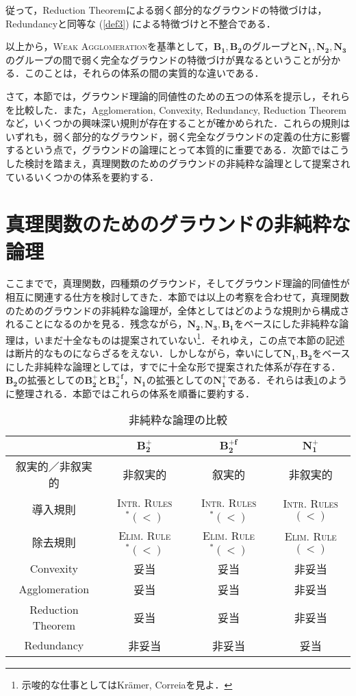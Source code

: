 \documentclass[twoside,14Q,dvipdfmx]{jsarticle}
\theoremstyle{definition}
\begin{document}
\noindent 従って，Reduction Theoremによる弱く部分的なグラウンドの特徴づけは，Redundancyと同等な (\ref{def3}) による特徴づけと不整合である．

以上から，\textsc{Weak Agglomeration}を基準として，$\mathbf{B_{1}}, \mathbf{B_{2}}$のグループと$\mathbf{N_{1}}, \mathbf{N_{2}}, \mathbf{N_{3}}$のグループの間で弱く完全なグラウンドの特徴づけが異なるということが分かる．このことは，それらの体系の間の実質的な違いである．

さて，本節では，グラウンド理論的同値性のための五つの体系を提示し，それらを比較した．また，Agglomeration, Convexity, Redundancy, Reduction Theoremなど，いくつかの興味深い規則が存在することが確かめられた．これらの規則はいずれも，弱く部分的なグラウンド，弱く完全なグラウンドの定義の仕方に影響するという点で，グラウンドの論理にとって本質的に重要である．次節ではこうした検討を踏まえ，真理関数のためのグラウンドの非純粋な論理として提案されているいくつかの体系を要約する．
%
%
%
\section{真理関数のためのグラウンドの非純粋な論理}\label{iplg}
ここまでで，真理関数，四種類のグラウンド，そしてグラウンド理論的同値性が相互に関連する仕方を検討してきた．本節では以上の考察を合わせて，真理関数のためのグラウンドの非純粋な論理が，全体としてはどのような規則から構成されることになるのかを見る．残念ながら，$\mathbf{N_{2}, N_{3}, B_{1}}$をベースにした非純粋な論理は，いまだ十全なものは提案されていない\footnote{示唆的な仕事としてはKr\"{a}mer\cite{Kramer2018,Kramer2021}, Correia\cite{Correia2016}を見よ．}．それゆえ，この点で本節の記述は断片的なものにならざるをえない．しかしながら，幸いにして$\mathbf{N_{1}, B_{2}}$をベースにした非純粋な論理としては，すでに十全な形で提案された体系が存在する．$\mathbf{B_{2}}$の拡張としての$\mathbf{B_{2}^{+}}$と$\mathbf{B_{2}^{+f}}$，$\mathbf{N_{1}}$の拡張としての$\mathbf{N_{1}^{+}}$である．それらは表\ref{ImpureLogics}のように整理される．本節ではこれらの体系を順番に要約する．

\begin{table}[h]
\caption{非純粋な論理の比較}
\label{ImpureLogics}
\centering
	\begin{tabular}{cccc}
	\hline
	 & $\mathbf{B_{2}^{+}}$ & $\mathbf{B_{2}^{+f}}$ & $\mathbf{N_{1}^{+}}$ \\
	\hline \hline
	叙実的／非叙実的 & 非叙実的 & 叙実的 & 非叙実的 \\
	導入規則 & \textsc{Intr. Rules$^{*}(<)$} & \textsc{Intr. Rules$^{*}(<)$} & \textsc{Intr. Rules$(<)$} \\
	除去規則 & \textsc{Elim. Rule$^{*}(<)$} & \textsc{Elim. Rule$^{*}(<)$} & \textsc{Elim. Rule$(<)$} \\
	Convexity & 妥当 & 妥当 & 非妥当 \\
	Agglomeration & 妥当 & 妥当 & 非妥当 \\
	Reduction Theorem & 妥当 & 妥当 & 非妥当 \\
	Redundancy & 非妥当 & 非妥当 & 妥当 \\
	\hline
	\end{tabular}
\end{table}
\end{document}
